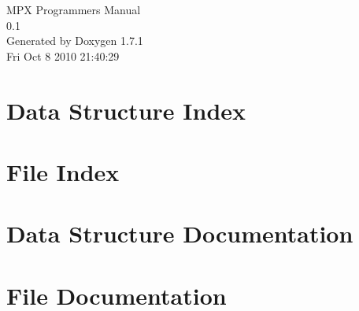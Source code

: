 \documentclass[a4paper]{book}
\begin{document}
\hypersetup{pageanchor=false}
\begin{titlepage}
\vspace*{7cm}
\begin{center}
{\Large MPX Programmers Manual \\[1ex]\large 0.1 }\\
\vspace*{1cm}
{\large Generated by Doxygen 1.7.1}\\
\vspace*{0.5cm}
{\small Fri Oct 8 2010 21:40:29}\\
\end{center}
\end{titlepage}
\clearemptydoublepage
{}
\tableofcontents
\clearemptydoublepage
{}
\hypersetup{pageanchor=true}
\chapter{Data Structure Index}

\chapter{File Index}

\chapter{Data Structure Documentation}






\chapter{File Documentation}














\printindex
\end{document}
